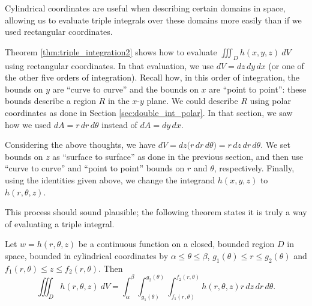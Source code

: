 Cylindrical coordinates are useful when describing certain domains in space, allowing us to evaluate triple integrals over these domains more easily than if we used rectangular coordinates.

Theorem \ref{thm:triple_integration2} shows how to evaluate $\iiint_Dh(x,y,z)\ dV$ using rectangular coordinates. In that evaluation, we use $dV = dz\,dy\,dx$ (or one of the other five orders of integration). Recall how, in this order of integration, the bounds on $y$ are ``curve to curve'' and the bounds on $x$ are ``point to point'': these bounds describe a region $R$ in the $x$-$y$ plane. We could describe $R$ using polar coordinates as done in Section \ref{sec:double_int_polar}. In that section, we saw how we used $dA = r\,dr\,d\theta$ instead of $dA = dy\,dx$. 

Considering the above thoughts, we have $dV = dz\big(r\,dr\,d\theta\big) = r\,dz\,dr\,d\theta$. We set bounds on $z$ as ``surface to surface'' as done in the previous section, and then use ``curve to curve'' and ``point to point'' bounds on $r$ and $\theta$, respectively. Finally, using the identities given above, we change the integrand $h(x,y,z)$ to $h(r,\theta,z)$.

This process should sound plausible; the following theorem states it is truly a way of evaluating a triple integral.

{%
Let $w=h(r,\theta,z)$ be a continuous function on a closed, bounded region $D$ in space, bounded in cylindrical coordinates by $\alpha \leq \theta \leq \beta$, $g_1(\theta)\leq r \leq g_2(\theta)$ and $f_1(r,\theta) \leq z \leq f_2(r,\theta)$. Then  
$$\iiint_D h(r,\theta,z)\ dV = \int_\alpha^\beta\int_{g_1(\theta)}^{g_2(\theta)}\int_{f_1(r,\theta)}^{f_2(r,\theta)}h(r,\theta,z) r\,dz\,dr\,d\theta.$$
}

